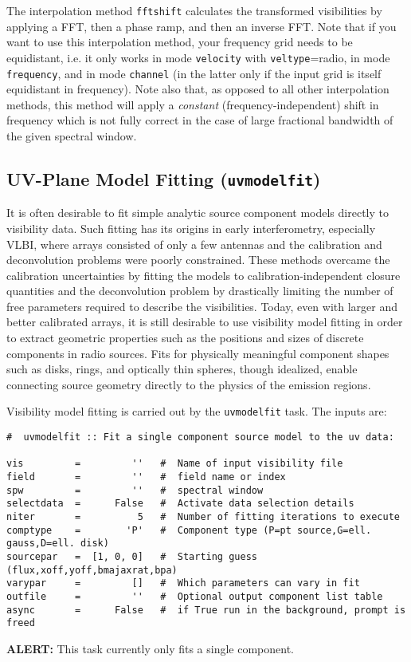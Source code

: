 The interpolation method {\tt fftshift} calculates the transformed
visibilities by applying a FFT, then a phase ramp, and then an inverse
FFT.  Note that if you want to use this interpolation method, your
frequency grid needs to be equidistant, i.e. it only works in mode
{\tt velocity} with {\tt veltype}=radio, in mode {\tt frequency}, and
in mode {\tt channel} (in the latter only if the input grid is itself
equidistant in frequency). Note also that, as opposed to all other
interpolation methods, this method will apply a {\it constant}
(frequency-independent) shift in frequency which is not fully correct
in the case of large fractional bandwidth of the given spectral
window.



\subsection{UV-Plane Model Fitting ({\tt uvmodelfit})}
\label{section:cal.other.uvmodelfit}

It is often desirable to fit simple analytic source component models
directly to visibility data.  Such fitting has its origins in early
interferometry, especially VLBI, where arrays consisted of only a few
antennas and the calibration and deconvolution problems were poorly
constrained.  These methods overcame the calibration uncertainties by
fitting the models to calibration-independent closure quantities and
the deconvolution problem by drastically limiting the number of free
parameters required to describe the visibilities.  Today, even with
larger and better calibrated arrays, it is still desirable to use
visibility model fitting in order to extract geometric properties such
as the positions and sizes of discrete components in radio sources.
Fits for physically meaningful component shapes such as disks, rings,
and optically thin spheres, though idealized, enable connecting source
geometry directly to the physics of the emission regions.

Visibility model fitting is carried out by the {\tt uvmodelfit} task.
The inputs are:
\small
\begin{verbatim}
#  uvmodelfit :: Fit a single component source model to the uv data:

vis         =         ''   #  Name of input visibility file
field       =         ''   #  field name or index
spw         =         ''   #  spectral window
selectdata  =      False   #  Activate data selection details
niter       =          5   #  Number of fitting iterations to execute
comptype    =        'P'   #  Component type (P=pt source,G=ell. gauss,D=ell. disk)
sourcepar   =  [1, 0, 0]   #  Starting guess (flux,xoff,yoff,bmajaxrat,bpa)
varypar     =         []   #  Which parameters can vary in fit
outfile     =         ''   #  Optional output component list table
async       =      False   #  if True run in the background, prompt is freed
\end{verbatim}
\normalsize
{\bf ALERT:} This task currently only fits a single component.


